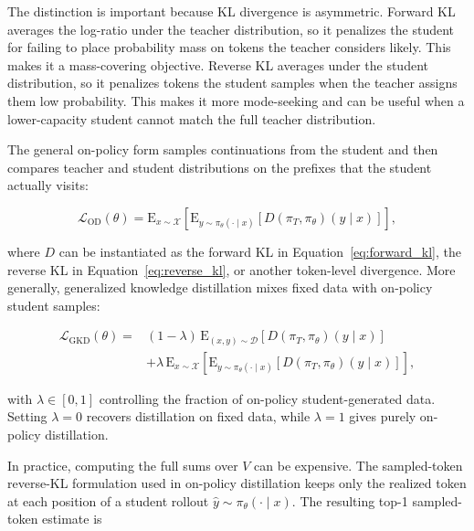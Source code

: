The distinction is important because KL divergence is asymmetric. Forward KL averages the log-ratio under the teacher distribution, so it penalizes the student for failing to place probability mass on tokens the teacher considers likely. This makes it a mass-covering objective. Reverse KL averages under the student distribution, so it penalizes tokens the student samples when the teacher assigns them low probability. This makes it more mode-seeking and can be useful when a lower-capacity student cannot match the full teacher distribution.

The general on-policy form samples continuations from the student and then compares teacher and student distributions on the prefixes that the student actually visits:

\begin{equation}
\mathcal{L}_{\mathrm{OD}}(\theta)
= \mathrm{E}_{x \sim \mathcal{X}}
\left[
\mathrm{E}_{y \sim \pi_\theta(\cdot \mid x)}
\left[
D(\pi_T, \pi_\theta)(y \mid x)
\right]
\right],
\label{eq:on_policy_distillation}
\end{equation}

where $D$ can be instantiated as the forward KL in Equation~\ref{eq:forward_kl}, the reverse KL in Equation~\ref{eq:reverse_kl}, or another token-level divergence. More generally, generalized knowledge distillation mixes fixed data with on-policy student samples:

\begin{equation}
\begin{array}{rl}
\mathcal{L}_{\mathrm{GKD}}(\theta)
=&
(1-\lambda)\,
\mathrm{E}_{(x,y) \sim \mathcal{D}}
\left[
D(\pi_T, \pi_\theta)(y \mid x)
\right]
\\
&+
\lambda\,
\mathrm{E}_{x \sim \mathcal{X}}
\left[
\mathrm{E}_{y \sim \pi_\theta(\cdot \mid x)}
\left[
D(\pi_T, \pi_\theta)(y \mid x)
\right]
\right],
\end{array}
\label{eq:gkd}
\end{equation}

with $\lambda \in [0,1]$ controlling the fraction of on-policy student-generated data. Setting $\lambda = 0$ recovers distillation on fixed data, while $\lambda = 1$ gives purely on-policy distillation.

In practice, computing the full sums over $V$ can be expensive. The sampled-token reverse-KL formulation used in on-policy distillation keeps only the realized token at each position of a student rollout $\hat{y} \sim \pi_\theta(\cdot \mid x)$. The resulting top-1 sampled-token estimate is

